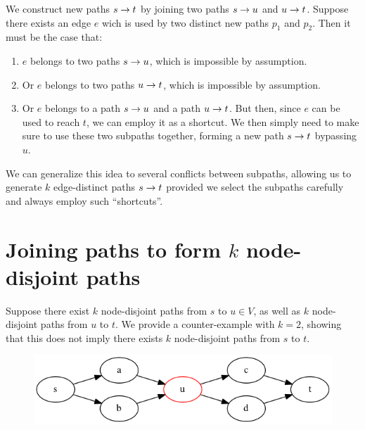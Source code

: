 We construct new paths $s \rightarrow t$ by joining two paths $s \rightarrow u$ and $u \rightarrow t$. Suppose there exists an edge $e$ wich is used by two distinct new paths $p_1$ and $p_2$. Then it must be the case that:

\begin{enumerate}
  \item $e$ belongs to two paths $s \rightarrow u$, which is impossible by assumption.
  \item Or $e$ belongs to two paths $u \rightarrow t$, which is impossible by assumption.
  \item Or $e$ belongs to a path $s \rightarrow u$ and a path $u \rightarrow t$. But then, since $e$ can be used to reach $t$, we can employ it as a shortcut. We then simply need to make sure to use these two subpaths together, forming a new path $s \rightarrow t$ bypassing $u$.
\end{enumerate}

We can generalize this idea to several conflicts between subpaths, allowing us to generate $k$ edge-distinct paths $s \rightarrow t$ provided we select the subpaths carefully and always employ such ``shortcuts''.

\section{Joining paths to form $k$ \textbf{node}-disjoint paths}
Suppose there exist $k$ node-disjoint paths from $s$ to $u \in V$, as well as $k$ node-disjoint paths from $u$ to $t$. We provide a counter-example with $k = 2$, showing that this does not imply there exists $k$ node-disjoint paths from $s$ to $t$.

\begin{figure}[ht]
  \center
  \includegraphics[width=12cm]{figures/3-4-graph.png}
\end{figure}
